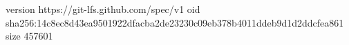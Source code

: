 version https://git-lfs.github.com/spec/v1
oid sha256:14c8ec8d43ea9501922dfacba2de23230c09eb378b4011ddeb9d1d2ddcfea861
size 457601
